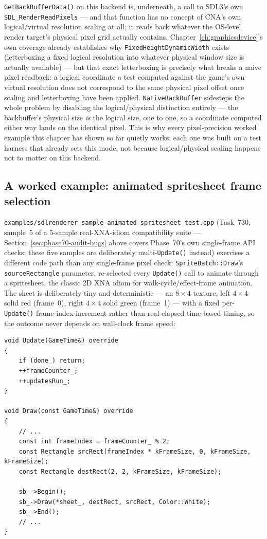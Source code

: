 \texttt{GetBackBufferData()} on this backend is, underneath, a call to SDL3's own
\texttt{SDL\_RenderReadPixels} --- and that function has no concept of CNA's own logical/virtual
resolution scaling at all; it reads back whatever the OS-level render target's physical pixel
grid actually contains. Chapter~\ref{ch:graphicsdevice}'s own 
coverage already establishes why \texttt{FixedHeightDynamicWidth} exists (letterboxing a fixed
logical resolution into whatever physical window size is actually available) --- but that exact
letterboxing is precisely what breaks a naive pixel readback: a logical coordinate a test
computed against the game's own virtual resolution does not correspond to the same physical
pixel offset once scaling and letterboxing have been applied. \texttt{NativeBackBuffer}
sidesteps the whole problem by disabling the logical/physical distinction entirely --- the
backbuffer's physical size \emph{is} the logical size, one to one, so a coordinate computed
either way lands on the identical pixel. This is why every pixel-precision worked example this
chapter has shown so far quietly works: each one was built on a test harness that already sets
this mode, not because logical/physical scaling happens not to matter on this backend.

\subsection{A worked example: animated spritesheet frame selection}

\texttt{examples/sdlrenderer\_sample\_animated\_spritesheet\_test.cpp} (Task~730, sample~5 of a
5-sample real-XNA-idiom compatibility suite --- Section~\ref{sec:phase70-audit-bugs} above
covers Phase~70's own single-frame API checks; these five samples are deliberately
multi-\texttt{Update()} instead) exercises a different code path than any single-frame pixel
check: \texttt{SpriteBatch::Draw}'s \texttt{sourceRectangle} parameter, re-selected every
\texttt{Update()} call to animate through a spritesheet, the classic 2D XNA idiom for
walk-cycle/effect-frame animation. The sheet is deliberately tiny and deterministic --- an
$8\times4$ texture, left $4\times4$ solid red (frame~0), right $4\times4$ solid green
(frame~1) --- with a fixed per-\texttt{Update()} frame-index increment rather than real
elapsed-time-based timing, so the outcome never depends on wall-clock frame speed:

\begin{lstlisting}
void Update(GameTime&) override
{
    if (done_) return;
    ++frameCounter_;
    ++updatesRun_;
}

void Draw(const GameTime&) override
{
    // ...
    const int frameIndex = frameCounter_ % 2;
    const Rectangle srcRect(frameIndex * kFrameSize, 0, kFrameSize, kFrameSize);
    const Rectangle destRect(2, 2, kFrameSize, kFrameSize);

    sb_->Begin();
    sb_->Draw(*sheet_, destRect, srcRect, Color::White);
    sb_->End();
    // ...
}
\end{lstlisting}

